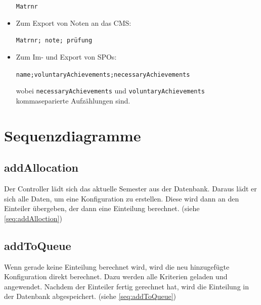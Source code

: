 \documentclass[parskip=full]{scrartcl}
\begin{document}
\begin{itemize}
   \begin{tcolorbox}[enhanced jigsaw,
 colback=testgrauRGB, %
 coltext=black, %
 sharp corners, %
 colframe=black, %
 boxrule=0pt %
 ]
 \texttt{Matrnr}
  \end{tcolorbox}
   \item Zum Export von Noten an das CMS: \\ \begin{tcolorbox}[enhanced
  jigsaw,
 colback=testgrauRGB, %
 coltext=black, %
 sharp corners, %
 colframe=black, %
 boxrule=0pt %
 ]
 \texttt{Matrnr; note; prüfung}
  \end{tcolorbox}
     \item Zum Im- und Export von SPOs: \\ \begin{tcolorbox}[enhanced
  jigsaw,
 colback=testgrauRGB, %
 coltext=black, %
 sharp corners, %
 colframe=black, %
 boxrule=0pt %
 ]
 \texttt{name;voluntaryAchievements;necessaryAchievements}
  \end{tcolorbox}
  wobei \texttt{necessaryAchievements} und \texttt{voluntaryAchievements}
  kommaseparierte Aufzählungen sind.
\end{itemize}




\section{Sequenzdiagramme}
\subsection{addAllocation}
Der Controller lädt sich das aktuelle Semester aus der Datenbank. Daraus lädt er sich alle Daten, um eine Konfiguration zu erstellen. Diese wird dann an den Einteiler übergeben, der dann eine Einteilung berechnet.
(siehe \autoref{seq:addAlloction})
\subsection{addToQueue}
Wenn gerade keine Einteilung berechnet wird, wird die neu hinzugefügte Konfiguration direkt berechnet. Dazu werden alle Kriterien geladen und angewendet. Nachdem der Einteiler fertig gerechnet hat, wird die Einteilung in der Datenbank abgespeichert.
(siehe \autoref{seq:addToQueue})
\end{document}
